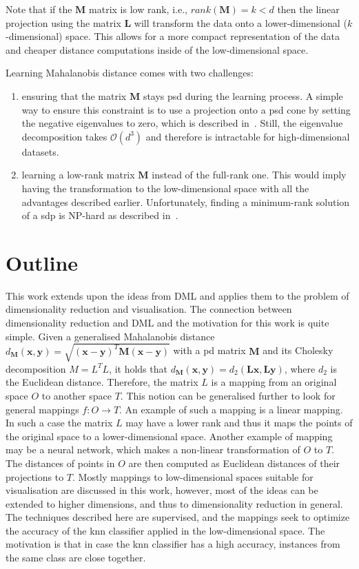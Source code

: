 \documentclass[12pt,a4paper]{report}
\begin{document}
Note that if the $\bm{M}$ matrix is low rank, i.e., $rank(\bm{M})=k<d$ then the linear projection using the matrix $\bm{L}$ will transform the data onto a lower-dimensional ($k$-dimensional) space. This allows for a more compact representation of the data and cheaper distance computations inside of the low-dimensional space.

Learning Mahalanobis distance comes with two challenges:
\begin{enumerate}
\item ensuring that the matrix $\bm{M}$ stays \ac{psd} during the learning process. A simple way to ensure this constraint is to use a projection onto a \ac{psd} cone by setting the negative eigenvalues to zero, which is described in~\citep{qian2015efficient}. Still, the eigenvalue decomposition takes $\mathcal{O}(d^3)$ and therefore is intractable for high-dimensional datasets.
\item learning a low-rank matrix $\bm{M}$ instead of the full-rank one. This would imply having the transformation to the low-dimensional space with all the advantages described earlier. Unfortunately, finding a minimum-rank solution of a \ac{sdp} is NP-hard as described in~\citep{lemon2016low}.
\end{enumerate}

\section{Outline}
This work extends upon the ideas from DML and applies them to the problem of dimensionality reduction and visualisation. The connection between dimensionality reduction and DML and the motivation for this work is quite simple. Given a generalised Mahalanobis distance $d_{\bm{M}}(\textbf{x},\textbf{y}) = \sqrt{(\textbf{x}-\textbf{y})^{T}\bm{M}(\textbf{x}-\textbf{y})}$ with a \ac{pd} matrix $\bm{M}$ and its Cholesky decomposition $M=L^TL$, it holds that $d_{\bm{M}}(\textbf{x},\textbf{y}) = d_{2}(\bm{L}\textbf{x},\bm{L}\textbf{y})$, where $d_2$ is the Euclidean distance. Therefore, the matrix $L$ is a mapping from an original space $O$ to another space $T$. This notion can be generalised further to look for general mappings $f: O \to T$. An example of such a mapping is a linear mapping. In such a case the matrix $L$ may have a lower rank and thus it maps the points of the original space to a lower-dimensional space. Another example of mapping may be a neural network, which makes a non-linear transformation of $O$ to $T$. The distances of points in $O$ are then computed as Euclidean distances of their projections to $T$. Mostly mappings to low-dimensional spaces suitable for visualisation are discussed in this work, however, most of the ideas can be extended to higher dimensions, and thus to dimensionality reduction in general. The techniques described here are supervised, and the mappings seek to optimize the accuracy of the \ac{knn} classifier applied in the low-dimensional space. The motivation is that in case the \ac{knn} classifier has a high accuracy, instances from the same class are close together.
\end{document}
